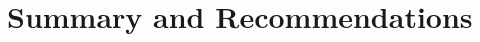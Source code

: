 \documentclass[draft]{agujournal2019}
\begin{document}
\begin{enumerate}

\end{enumerate}









\section{Summary and Recommendations}
\label{sect:conclusions}
\end{document}
